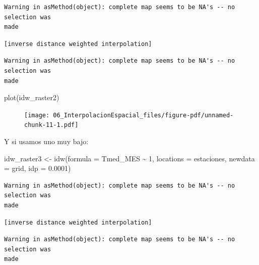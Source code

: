 \documentclass[
  letterpaper,
  DIV=11,
  numbers=noendperiod]{scrreprt}
\newenvironment{Shaded}{\begin{snugshade}}{\end{snugshade}}
\newcommand{\AttributeTok}[1]{\textcolor[rgb]{0.40,0.45,0.13}{#1}}
\newcommand{\DecValTok}[1]{\textcolor[rgb]{0.68,0.00,0.00}{#1}}
\newcommand{\FloatTok}[1]{\textcolor[rgb]{0.68,0.00,0.00}{#1}}
\newcommand{\FunctionTok}[1]{\textcolor[rgb]{0.28,0.35,0.67}{#1}}
\newcommand{\NormalTok}[1]{\textcolor[rgb]{0.00,0.23,0.31}{#1}}
\newcommand{\OtherTok}[1]{\textcolor[rgb]{0.00,0.23,0.31}{#1}}
\newcommand{\SpecialCharTok}[1]{\textcolor[rgb]{0.37,0.37,0.37}{#1}}
\begin{document}
\begin{verbatim}
Warning in asMethod(object): complete map seems to be NA's -- no selection was
made
\end{verbatim}

\begin{verbatim}
[inverse distance weighted interpolation]
\end{verbatim}

\begin{verbatim}
Warning in asMethod(object): complete map seems to be NA's -- no selection was
made
\end{verbatim}

\begin{Shaded}
\begin{Highlighting}[]
\FunctionTok{plot}\NormalTok{(idw\_raster2)}
\end{Highlighting}
\end{Shaded}

\begin{figure}[H]

{\centering \texttt{[image: 06\_InterpolacionEspacial\_files/figure-pdf/unnamed-chunk-11-1.pdf]}

}

\end{figure}

Y si usamos uno muy bajo:

\begin{Shaded}
\begin{Highlighting}[]
\NormalTok{idw\_raster3 }\OtherTok{\textless{}{-}} \FunctionTok{idw}\NormalTok{(}\AttributeTok{formula =}\NormalTok{ Tmed\_MES }\SpecialCharTok{\textasciitilde{}} \DecValTok{1}\NormalTok{, }\AttributeTok{locations =}\NormalTok{ estaciones, }\AttributeTok{newdata =}\NormalTok{ grid, }\AttributeTok{idp =} \FloatTok{0.0001}\NormalTok{)}
\end{Highlighting}
\end{Shaded}

\begin{verbatim}
Warning in asMethod(object): complete map seems to be NA's -- no selection was
made
\end{verbatim}

\begin{verbatim}
[inverse distance weighted interpolation]
\end{verbatim}

\begin{verbatim}
Warning in asMethod(object): complete map seems to be NA's -- no selection was
made
\end{verbatim}
\end{document}
